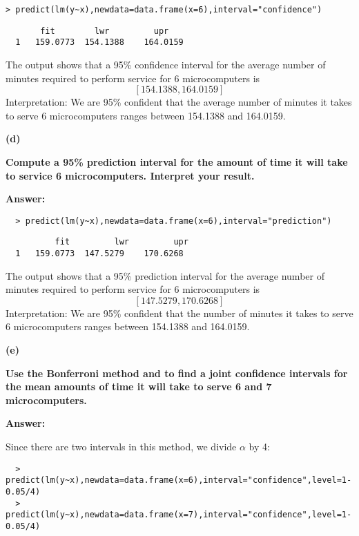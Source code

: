 \documentclass[letterpaper,11pt]{article}
\begin{document}
\begin{lstlisting}
> predict(lm(y~x),newdata=data.frame(x=6),interval="confidence")
\end{lstlisting}

\begin{lstlisting}
       fit	      lwr	      upr
  1	  159.0773	154.1388	164.0159
\end{lstlisting}

The output shows that a 95\% confidence interval for the average number of minutes required to perform service for 6 microcomputers is $$[154.1388, 164.0159]$$
Interpretation: We are 95\% confident that the average number of minutes it takes to serve 6 microcomputers ranges between 154.1388 and 164.0159.
  \bigbreak
  \begin{addmargin}[-1.1em]{0em}
  \textbf{(d)}\par\end{addmargin}
    \textbf{Compute a 95\% prediction interval for the amount of time it will take to service 6 microcomputers. Interpret your result.
}\par

  \bigbreak
  \begin{addmargin}[-0.5em]{0em}
  \textbf{Answer: }\end{addmargin}
  \begin{lstlisting}
  > predict(lm(y~x),newdata=data.frame(x=6),interval="prediction")
  \end{lstlisting}

\begin{lstlisting}
          fit	      lwr	      upr
  1	  159.0773	147.5279	170.6268
\end{lstlisting}
The output shows that a 95\% prediction interval for the average number of minutes required to perform service for 6 microcomputers is $$[147.5279, 170.6268]$$
Interpretation: We are 95\% confident that the number of minutes it takes to serve 6 microcomputers ranges between 154.1388 and 164.0159.

  \bigbreak
  \begin{addmargin}[-1.1em]{0em}
  \textbf{(e)}\par\end{addmargin}
    \textbf{Use the Bonferroni method and to find a joint confidence intervals for the mean amounts of time it will take to serve 6 and 7 microcomputers.}\par
  \bigbreak
  \begin{addmargin}[-0.5em]{0em}
  \textbf{Answer: }\end{addmargin}
Since there are two intervals in this method, we divide $\alpha$ by 4:
\begin{lstlisting}
  > predict(lm(y~x),newdata=data.frame(x=6),interval="confidence",level=1-0.05/4)
  > predict(lm(y~x),newdata=data.frame(x=7),interval="confidence",level=1-0.05/4)
\end{lstlisting}
\end{document}
